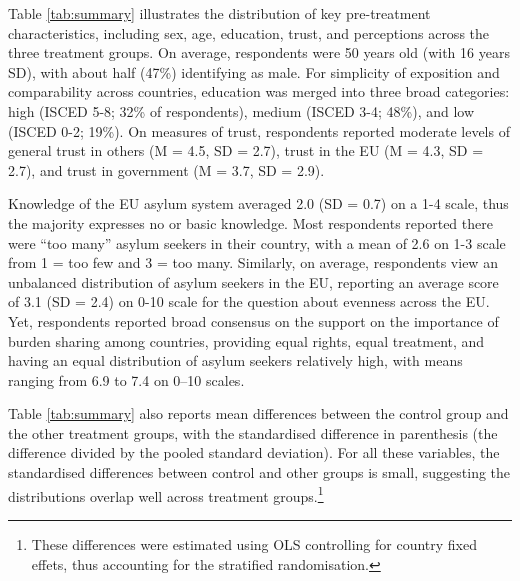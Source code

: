 \documentclass[
  12pt,
  a4paper,
]{article}
\begin{document}
Table \ref{tab:summary} illustrates the distribution of key pre-treatment characteristics, including sex, age, education, trust, and perceptions across the three treatment groups. On average, respondents were 50 years old (with 16 years SD), with about half (47\%) identifying as male. For simplicity of exposition and comparability across countries, education was merged into three broad categories: high (ISCED 5-8; 32\% of respondents), medium (ISCED 3-4; 48\%), and low (ISCED 0-2; 19\%). On measures of trust, respondents reported moderate levels of general trust in others (M = 4.5, SD = 2.7), trust in the EU (M = 4.3, SD = 2.7), and trust in government (M = 3.7, SD = 2.9).

Knowledge of the EU asylum system averaged 2.0 (SD = 0.7) on a 1-4 scale, thus the majority expresses no or basic knowledge. Most respondents reported there were ``too many'' asylum seekers in their country, with a mean of 2.6 on 1-3 scale from 1 = too few and 3 = too many. Similarly, on average, respondents view an unbalanced distribution of asylum seekers in the EU, reporting an average score of 3.1 (SD = 2.4) on 0-10 scale for the question about evenness across the EU. Yet, respondents reported broad consensus on the support on the importance of burden sharing among countries, providing equal rights, equal treatment, and having an equal distribution of asylum seekers relatively high, with means ranging from 6.9 to 7.4 on 0--10 scales.

Table \ref{tab:summary} also reports mean differences between the control group and the other treatment groups, with the standardised difference in parenthesis (the difference divided by the pooled standard deviation). For all these variables, the standardised differences between control and other groups is small, suggesting the distributions overlap well across treatment groups.\footnote{
  These differences were estimated using OLS controlling for country fixed effets, thus accounting for the stratified randomisation.}
\end{document}
